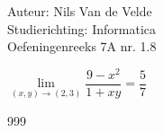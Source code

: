 \documentclass[a4paper]{article}
\newcommand{\llim}{\lim\limits}
\begin{document}
  
\noindent \large Auteur: Nils Van de Velde \\
\noindent \large Studierichting: Informatica\\
\noindent \large Oefeningenreeks 7A nr. 1.8\\

\medskip

\normalsize

$\llim_{(x,y)\rightarrow(2,3)} \dfrac{9-x^2}{1+xy}=\dfrac{5}{7}$\\

\begin{thebibliography}{999}
\end{thebibliography}
\end{document}
